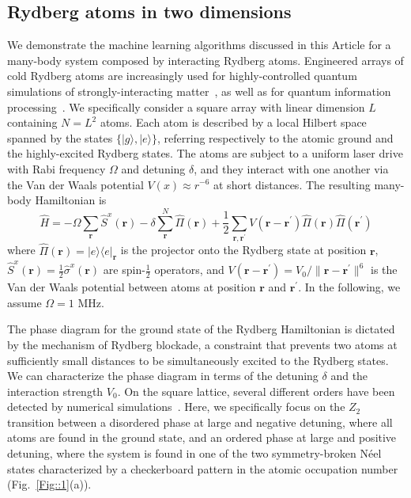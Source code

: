 \documentclass[twocolumn,english,reprint,superscriptaddress,longbibliography,pra]{revtex4-1}
\begin{document}
\subsection{Rydberg atoms in two dimensions}
\label{preliminariesB}
We demonstrate the machine learning algorithms discussed in this Article for a many-body system composed by interacting Rydberg atoms. Engineered arrays of cold Rydberg atoms are increasingly used for highly-controlled quantum simulations of strongly-interacting   matter~\cite{Schauss1455,Endres2016,Labuhn,Bernien2017,keesling_quantum_2019,2020arXiv201212281E,2020arXiv201212268S}, as well as for quantum information processing~\cite{Levine2019}. We specifically consider a square array with linear dimension $L$ containing $N = L^2$ atoms. Each atom is described by a local Hilbert space spanned by the states $\{|g\rangle,|e\rangle\}$, referring respectively to the atomic ground and the highly-excited Rydberg states. The atoms are subject to a uniform laser drive with Rabi frequency $\Omega$ and detuning $\delta$, and they interact with one another via the Van der Waals potential $V(x)\approx r^{-6}$ at short distances. The resulting many-body Hamiltonian is
\begin{equation}
\hat{H} = -\Omega \sum_{\bm{r}}\hat{S}^x(\bm{r}) -\delta\sum_{\bm{r}}^N\hat{\Pi}(\bm{r}) +\frac{1}{2}\sum_{\bm{r},\bm{r^\prime}}V(\bm{r}-\bm{r^\prime})\hat{\Pi}(\bm{r}) \hat{\Pi}(\bm{r^\prime}) 
\label{Eq::RydbergHamiltonian}
\end{equation}
where $\hat{\Pi}(\bm{r}) =|e\rangle\!\langle e|_{\bm{r}} $ is the projector onto the Rydberg state at position $\bm{r}$, $\hat{S}^x(\bm{r})=\frac{1}{2}\hat\sigma^x(\bm{r})$ are spin-$\frac{1}{2}$ operators, and $V(\bm{r}-\bm{r^\prime})=V_0/\|\bm{r}-\bm{r^\prime}\|^6$ is the Van der Waals potential between atoms at position $\bm{r}$ and $\bm{r^{\prime}}$. In the following, we assume $\Omega=1$ MHz. 

The phase diagram for the ground state of the Rydberg Hamiltonian is dictated by the mechanism of Rydberg blockade, a constraint that prevents two atoms at sufficiently small distances to be simultaneously excited to the Rydberg states. We can characterize the phase diagram in terms of the detuning $\delta$ and the interaction strength $V_0$. On the square lattice, several different orders have been detected by numerical simulations~\cite{Samajdar2020}. Here, we specifically focus on the $Z_2$ transition between a disordered phase at large and negative detuning, where all atoms are found in the ground state, and an ordered phase at large and positive detuning, where the system is found in one of the two symmetry-broken N\'eel states  characterized by a checkerboard pattern in the atomic occupation number (Fig.~\ref{Fig::1}(a)). 
\end{document}
